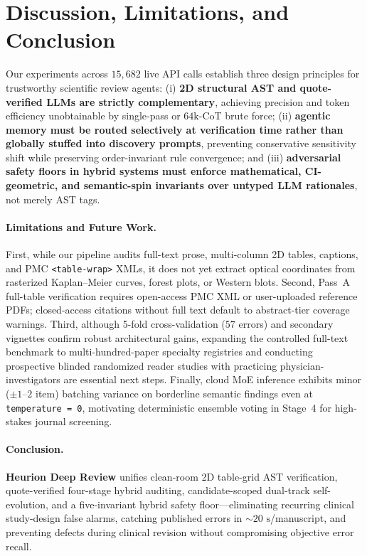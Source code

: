 \documentclass[11pt,a4paper]{article}
\begin{document}
\section{Discussion, Limitations, and Conclusion}
\label{sec:discussion}

Our experiments across $15{,}682$ live API calls establish three design principles for trustworthy scientific review agents: (i) \textbf{2D structural AST and quote-verified LLMs are strictly complementary}, achieving precision and token efficiency unobtainable by single-pass or $64\text{k}$-CoT brute force; (ii) \textbf{agentic memory must be routed selectively at verification time rather than globally stuffed into discovery prompts}, preventing conservative sensitivity shift while preserving order-invariant rule convergence; and (iii) \textbf{adversarial safety floors in hybrid systems must enforce mathematical, CI-geometric, and semantic-spin invariants over untyped LLM rationales}, not merely AST tags.

\paragraph{Limitations and Future Work.}
First, while our pipeline audits full-text prose, multi-column 2D tables, captions, and PMC \texttt{<table-wrap>} XMLs, it does not yet extract optical coordinates from rasterized Kaplan--Meier curves, forest plots, or Western blots. Second, Pass~A full-table verification requires open-access PMC XML or user-uploaded reference PDFs; closed-access citations without full text default to abstract-tier coverage warnings. Third, although 5-fold cross-validation ($57$ errors) and secondary vignettes confirm robust architectural gains, expanding the controlled full-text benchmark to multi-hundred-paper specialty registries and conducting prospective blinded randomized reader studies with practicing physician-investigators are essential next steps. Finally, cloud MoE inference exhibits minor ($\pm 1$--$2$ item) batching variance on borderline semantic findings even at \texttt{temperature = 0}, motivating deterministic ensemble voting in Stage~4 for high-stakes journal screening.

\paragraph{Conclusion.}
\textbf{Heurion Deep Review} unifies clean-room 2D table-grid AST verification, quote-verified four-stage hybrid auditing, candidate-scoped dual-track self-evolution, and a five-invariant hybrid safety floor---eliminating recurring clinical study-design false alarms, catching published errors in $\sim 20\text{ s}$/manuscript, and preventing defects during clinical revision without compromising objective error recall.
\end{document}
